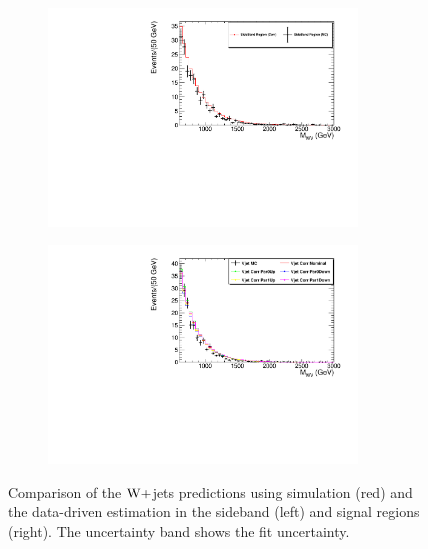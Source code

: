 \begin{figure}[!htbp] 
	 \centering 
	 \begin{subfigure}[b]{0.46\textwidth}
	 	\includegraphics[width=0.9\textwidth]{Plots/BackgroundEstimation/WV/WVchannel_SideBandRegionComparison_VjetShape_MC_CorrShapeFromData.pdf}\qquad
        \caption{ }
        \label{fig:Foil_and_Cone_a}
    \end{subfigure}
	 \begin{subfigure}[b]{0.46\textwidth}
	 	\includegraphics[width=0.9\textwidth]{Plots/BackgroundEstimation/WV/WVchannel_SignalRegionComparison_VjetShape_MC_CorrShapeFromData.pdf}\qquad
        \caption{ }
        \label{fig:Foil_and_Cone_a1}
    \end{subfigure}
	 \caption{Comparison of the $\mathrm{W}+$jets predictions using simulation (red) and the data-driven estimation in the sideband (left) and signal regions (right). The uncertainty band shows the fit uncertainty.}
	 \label{fig:signal}
\end{figure}

